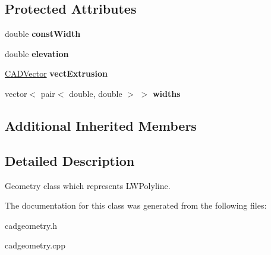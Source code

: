 \subsection*{Protected Attributes}
\begin{DoxyCompactItemize}
\item 
double {\bfseries const\+Width}\hypertarget{class_c_a_d_l_w_polyline_aa0e89d7b67e44eff0a8168cd0410d09c}{}\label{class_c_a_d_l_w_polyline_aa0e89d7b67e44eff0a8168cd0410d09c}

\item 
double {\bfseries elevation}\hypertarget{class_c_a_d_l_w_polyline_a23e9200c2b4015eb1616526e02577bee}{}\label{class_c_a_d_l_w_polyline_a23e9200c2b4015eb1616526e02577bee}

\item 
\hyperlink{class_c_a_d_vector}{C\+A\+D\+Vector} {\bfseries vect\+Extrusion}\hypertarget{class_c_a_d_l_w_polyline_a9e02be37368c57e9d0624590af5b054d}{}\label{class_c_a_d_l_w_polyline_a9e02be37368c57e9d0624590af5b054d}

\item 
vector$<$ pair$<$ double, double $>$ $>$ {\bfseries widths}\hypertarget{class_c_a_d_l_w_polyline_a264af25fecf4a94f0c1fe65f368217ce}{}\label{class_c_a_d_l_w_polyline_a264af25fecf4a94f0c1fe65f368217ce}

\end{DoxyCompactItemize}
\subsection*{Additional Inherited Members}


\subsection{Detailed Description}
Geometry class which represents L\+W\+Polyline. 

The documentation for this class was generated from the following files\+:\begin{DoxyCompactItemize}
\item 
cadgeometry.\+h\item 
cadgeometry.\+cpp\end{DoxyCompactItemize}
